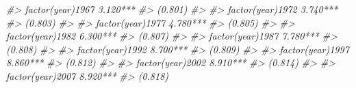 \documentclass[]{book}
\newenvironment{Shaded}{\begin{snugshade}}{\end{snugshade}}
\newcommand{\CommentTok}[1]{\textcolor[rgb]{0.56,0.35,0.01}{\textit{#1}}}
\begin{document}
\begin{Shaded}
\begin{Highlighting}[]
\CommentTok{#> factor(year)1967                                         3.120***                    }
\CommentTok{#>                                                          (0.801)                     }
\CommentTok{#>                                                                                      }
\CommentTok{#> factor(year)1972                                         3.740***                    }
\CommentTok{#>                                                          (0.803)                     }
\CommentTok{#>                                                                                      }
\CommentTok{#> factor(year)1977                                         4.780***                    }
\CommentTok{#>                                                          (0.805)                     }
\CommentTok{#>                                                                                      }
\CommentTok{#> factor(year)1982                                         6.300***                    }
\CommentTok{#>                                                          (0.807)                     }
\CommentTok{#>                                                                                      }
\CommentTok{#> factor(year)1987                                         7.780***                    }
\CommentTok{#>                                                          (0.808)                     }
\CommentTok{#>                                                                                      }
\CommentTok{#> factor(year)1992                                         8.700***                    }
\CommentTok{#>                                                          (0.809)                     }
\CommentTok{#>                                                                                      }
\CommentTok{#> factor(year)1997                                         8.860***                    }
\CommentTok{#>                                                          (0.812)                     }
\CommentTok{#>                                                                                      }
\CommentTok{#> factor(year)2002                                         8.910***                    }
\CommentTok{#>                                                          (0.814)                     }
\CommentTok{#>                                                                                      }
\CommentTok{#> factor(year)2007                                         8.920***                    }
\CommentTok{#>                                                          (0.818)                     }

\end{Highlighting}
\end{Shaded}
\end{document}
